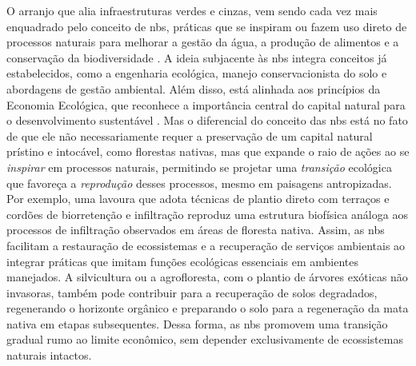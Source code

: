 \documentclass[./main.tex]{subfiles}
\begin{document}
\par O arranjo que alia infraestruturas verdes e cinzas, vem sendo cada vez mais enquadrado pelo conceito de \acrfull{nbs}, práticas que se inspiram ou fazem uso direto de processos naturais para melhorar a gestão da água, a produção de alimentos e a conservação da biodiversidade \cite{un2018, fao2019}. A ideia subjacente às \acrshort{nbs} integra conceitos já estabelecidos, como a engenharia ecológica, manejo conservacionista do solo e abordagens de gestão ambiental. Além disso, está alinhada aos princípios da Economia Ecológica, que reconhece a importância central do capital natural para o desenvolvimento sustentável \cite{nesshover2017}. Mas o diferencial do conceito das \acrshort{nbs} está no fato de que ele não necessariamente requer a preservação de um capital natural prístino e intocável, como florestas nativas, mas que expande o raio de ações ao se \textit{inspirar} em processos naturais, permitindo se projetar uma \textit{transição} ecológica que favoreça a \textit{reprodução} desses processos, mesmo em paisagens antropizadas. Por exemplo, uma lavoura que adota técnicas de plantio direto com terraços e cordões de biorretenção e infiltração reproduz uma estrutura biofísica análoga aos processos de infiltração observados em áreas de floresta nativa. Assim, as \acrshort{nbs} facilitam a restauração de ecossistemas e a recuperação de serviços ambientais ao integrar práticas que imitam funções ecológicas essenciais em ambientes manejados. A silvicultura ou a agrofloresta, com o plantio de árvores exóticas não invasoras, também pode contribuir para a recuperação de solos degradados, regenerando o horizonte orgânico e preparando o solo para a regeneração da mata nativa em etapas subsequentes. Dessa forma, as \acrshort{nbs} promovem uma transição gradual rumo ao limite econômico, sem depender exclusivamente de ecossistemas naturais intactos.
\end{document}
